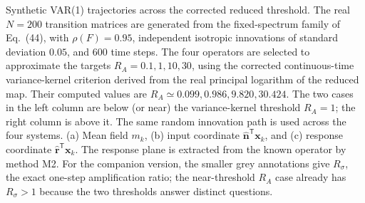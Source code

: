 \caption{Synthetic VAR(1) trajectories across the corrected reduced threshold.
The real $N=200$ transition matrices are generated from the fixed-spectrum
family of Eq.~(44), with $\rho(F)=0.95$, independent isotropic innovations
of standard deviation $0.05$, and $600$ time steps. The four operators are
selected to approximate the targets $R_A=0.1,1,10,30$, using the corrected
continuous-time variance-kernel criterion derived from the real principal
logarithm of the reduced map. Their computed values are $R_A\simeq
0.099,0.986,9.820,30.424$. The two cases in the left column are below
(or near) the variance-kernel threshold $R_A=1$; the right column is
above it. The same random innovation path is used across the four systems.
(a) Mean field $m_k$, (b) input coordinate $\widehat{\mathbf{n}}^{\mathsf T}\mathbf{x}_k$,
and (c) response coordinate $\widehat{\mathbf{r}}^{\mathsf T}\mathbf{x}_k$.
The response plane is extracted from the known operator by method M2.
For the companion version, the smaller grey annotations give $R_\sigma$,
the exact one-step amplification ratio; the near-threshold $R_A$ case
already has $R_\sigma>1$ because the two thresholds answer distinct questions.}
